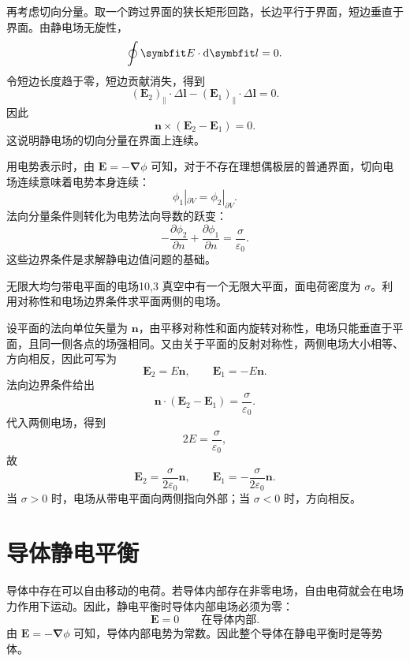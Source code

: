 再考虑切向分量。取一个跨过界面的狭长矩形回路，长边平行于界面，短边垂直于界面。由静电场无旋性，
\[
\oint \bm{E}\cdot\dif\bm{l}=0.
\]
令短边长度趋于零，短边贡献消失，得到
\[
(\bm{E}_{2})_{\parallel}\cdot\Delta\bm{l}
-
(\bm{E}_{1})_{\parallel}\cdot\Delta\bm{l}
=
0.
\]
因此
\begin{equation}
	\bm{n}\times(\bm{E}_{2}-\bm{E}_{1})=0.
	\label{eq:10:boundary-tangential-e}
\end{equation}
这说明静电场的切向分量在界面上连续。

用电势表示时，由 $\bm{E}=-\bm{\nabla}\phi$ 可知，对于不存在理想偶极层的普通界面，切向电场连续意味着电势本身连续：
\[
\phi_{1}|_{\partial V}
=
\phi_{2}|_{\partial V}.
\]
法向分量条件则转化为电势法向导数的跃变：
\[
-\frac{\partial\phi_{2}}{\partial n}
+
\frac{\partial\phi_{1}}{\partial n}
=
\frac{\sigma}{\varepsilon_{0}}.
\]
这些边界条件是求解静电边值问题的基础。

\begin{example}{无限大均匀带电平面的电场}{10,3}
真空中有一个无限大平面，面电荷密度为 $\sigma$。利用对称性和电场边界条件求平面两侧的电场。

\begin{solution}
设平面的法向单位矢量为 $\bm{n}$，由平移对称性和面内旋转对称性，电场只能垂直于平面，且同一侧各点的场强相同。又由关于平面的反射对称性，两侧电场大小相等、方向相反，因此可写为
\[
\bm{E}_{2}=E\bm{n},
\qquad
\bm{E}_{1}=-E\bm{n}.
\]
法向边界条件给出
\[
\bm{n}\cdot(\bm{E}_{2}-\bm{E}_{1})
=
\frac{\sigma}{\varepsilon_{0}}.
\]
代入两侧电场，得到
\[
2E=\frac{\sigma}{\varepsilon_{0}},
\]
故
\[
\bm{E}_{2}
=
\frac{\sigma}{2\varepsilon_{0}}\bm{n},
\qquad
\bm{E}_{1}
=
-\frac{\sigma}{2\varepsilon_{0}}\bm{n}.
\]
当 $\sigma>0$ 时，电场从带电平面向两侧指向外部；当 $\sigma<0$ 时，方向相反。
\end{solution}
\end{example}

\section{导体静电平衡}

导体中存在可以自由移动的电荷。若导体内部存在非零电场，自由电荷就会在电场力作用下运动。因此，静电平衡时导体内部电场必须为零：
\begin{equation}
	\bm{E}=0
	\qquad
	\text{在导体内部}.
	\label{eq:10:conductor-e-zero}
\end{equation}
由 $\bm{E}=-\bm{\nabla}\phi$ 可知，导体内部电势为常数。因此整个导体在静电平衡时是等势体。

